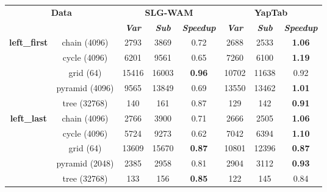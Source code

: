 \begin{table}[ht]
\centering
\footnotesize{
  \begin{tabular}{cc|ccc|ccc}
   \hline
    \hline
    \multicolumn{2}{c|}{\multirow{2}{*}{\small{\textbf{Data}}}} & \multicolumn{3}{c|}{\small{\textbf{SLG-WAM}}} & \multicolumn{3}{c}{\small{\textbf{YapTab}}} \\
     \multicolumn{2}{c|}{} & \textbf{\textit{Var}} & \textbf{\textit{Sub}} & \textbf{\textit{Speedup}} & \textbf{\textit{Var}} & \textbf{\textit{Sub}} & \textbf{\textit{Speedup}} \\
   \hline
   \hline
   \multirow{5}{*}{\textbf{left\_first}} &  \scriptsize{chain  (4096) }  &  2793 & 3869 &  0.72  & 2688 & 2533 &  \textbf{1.06} \\
   &  \scriptsize{cycle  (4096) }  &  6201 & 9561 &  0.65  & 7260 & 6100 &  \textbf{1.19} \\
   &  \scriptsize{grid  (64) }  &  15416 & 16003 &  \textbf{0.96}  & 10702 & 11638 &  0.92 \\
   &  \scriptsize{pyramid  (4096) }  &  9565 & 13849 &  0.69  & 13550 & 13462 &  \textbf{1.01} \\
   &  \scriptsize{tree  (32768) }  &  140 & 161 &  0.87  & 129 & 142 &  \textbf{0.91} \\
   \hline
   \multirow{5}{*}{\textbf{left\_last}} &  \scriptsize{chain  (4096) }  &  2766 & 3900 &  0.71  & 2666 & 2505 &  \textbf{1.06} \\
   &  \scriptsize{cycle  (4096) }  &  5724 & 9273 &  0.62  & 7042 & 6394 &  \textbf{1.10} \\
   &  \scriptsize{grid  (64) }  &  13609 & 15670 &  \textbf{0.87}  & 10801 & 12396 &  \textbf{0.87} \\
   &  \scriptsize{pyramid  (2048) }  &  2385 & 2958 &  0.81  & 2904 & 3112 &  \textbf{0.93} \\
   &  \scriptsize{tree  (32768) }  &  133 & 156 &  \textbf{0.85}  & 122 & 145 &  0.84 \\
   \hline


\end{tabular}}
\end{table}
